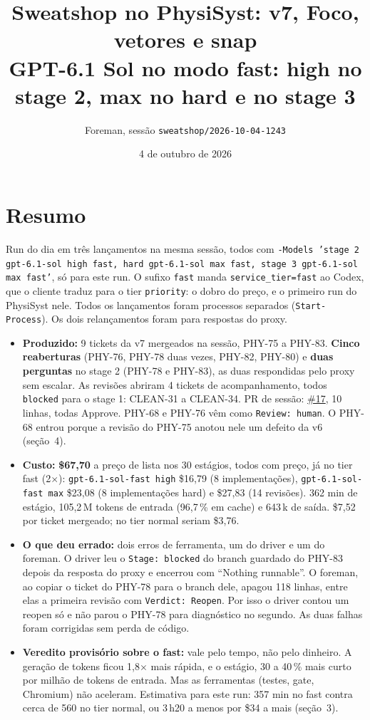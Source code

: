 \documentclass[11pt,a4paper]{article}
\title{Sweatshop no PhysiSyst: v7, Foco, vetores e snap\\\large GPT-6.1 Sol no modo fast: high no stage 2, max no hard e no stage 3}
\author{Foreman, sessão \texttt{sweatshop/2026-10-04-1243}}
\date{4 de outubro de 2026}
\begin{document}
\maketitle

\section*{Resumo}

Run do dia em três lançamentos na mesma sessão, todos com
\texttt{-Models 'stage 2 gpt-6.1-sol high fast, hard gpt-6.1-sol max fast,
stage 3 gpt-6.1-sol max fast'}, só para este run. O sufixo \texttt{fast} manda
\texttt{service\_tier=fast} ao Codex, que o cliente traduz para o tier
\texttt{priority}: o dobro do preço, e o primeiro run do PhysiSyst nele. Todos
os lançamentos foram processos separados (\texttt{Start-Process}). Os dois
relançamentos foram para respostas do proxy.

\begin{itemize}
  \item \textbf{Produzido:} 9 tickets da v7 mergeados na sessão, PHY-75 a
        PHY-83. \textbf{Cinco reaberturas} (PHY-76, PHY-78 duas vezes, PHY-82,
        PHY-80) e \textbf{duas perguntas} no stage 2 (PHY-78 e PHY-83), as duas
        respondidas pelo proxy sem escalar. As revisões abriram 4 tickets de
        acompanhamento, todos \texttt{blocked} para o stage 1: CLEAN-31 a
        CLEAN-34. PR de sessão:
        \href{https://github.com/Laginho/PhysiSyst/pull/17}{\#17}, 10 linhas,
        todas Approve. PHY-68 e PHY-76 vêm como \texttt{Review: human}. O PHY-68
        entrou porque a revisão do PHY-75 anotou nele um defeito da v6
        (seção~4).
  \item \textbf{Custo:} \textbf{\$67,70} a preço de lista nos 30 estágios,
        todos com preço, já no tier fast (2$\times$):
        \texttt{gpt-6.1-sol-fast high} \$16,79 (8 implementações),
        \texttt{gpt-6.1-sol-fast max} \$23,08 (8 implementações hard) e \$27,83
        (14 revisões). 362 min de estágio, 105,2\,M tokens de entrada (96,7\,\%
        em cache) e 643\,k de saída. \$7,52 por ticket mergeado; no tier normal
        seriam \$3,76.
  \item \textbf{O que deu errado:} dois erros de ferramenta, um do driver e um
        do foreman. O driver leu o \texttt{Stage: blocked} do branch guardado do
        PHY-83 depois da resposta do proxy e encerrou com ``Nothing runnable''.
        O foreman, ao copiar o ticket do PHY-78 para o branch dele, apagou 118
        linhas, entre elas a primeira revisão com \texttt{Verdict: Reopen}. Por
        isso o driver contou um reopen só e não parou o PHY-78 para diagnóstico
        no segundo. As duas falhas foram corrigidas sem perda de código.
  \item \textbf{Veredito provisório sobre o fast:} vale pelo tempo, não pelo
        dinheiro. A geração de tokens ficou 1,8$\times$ mais rápida, e o
        estágio, 30 a 40\,\% mais curto por milhão de tokens de entrada. Mas as
        ferramentas (testes, gate, Chromium) não aceleram. Estimativa para
        este run: 357 min no fast contra cerca de 560 no tier normal, ou
        3\,h20 a menos por \$34 a mais (seção~3).
\end{itemize}
\end{document}
